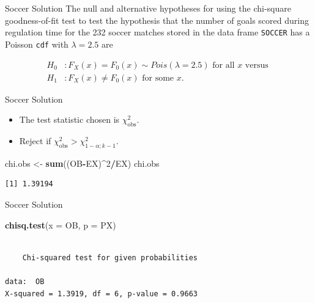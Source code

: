 \documentclass[
  ignorenonframetext,
]{beamer}
\newenvironment{Shaded}{\begin{snugshade}}{\end{snugshade}}
\newcommand{\AttributeTok}[1]{\textcolor[rgb]{0.13,0.29,0.53}{#1}}
\newcommand{\DecValTok}[1]{\textcolor[rgb]{0.00,0.00,0.81}{#1}}
\newcommand{\FunctionTok}[1]{\textcolor[rgb]{0.13,0.29,0.53}{\textbf{#1}}}
\newcommand{\NormalTok}[1]{#1}
\newcommand{\OtherTok}[1]{\textcolor[rgb]{0.56,0.35,0.01}{#1}}
\newcommand{\SpecialCharTok}[1]{\textcolor[rgb]{0.81,0.36,0.00}{\textbf{#1}}}
\begin{document}
\begin{frame}[fragile]{Soccer Solution}
\label{soccer-solution-4}
The null and alternative hypotheses for using the chi-square
goodness-of-fit test to test the hypothesis that the number of goals
scored during regulation time for the 232 soccer matches stored in the
data frame \texttt{SOCCER} has a Poisson \texttt{cdf} with
\(\lambda=2.5\) are

\begin{align*}
        H_0&: F_X(x) = F_0(x) \sim Pois(\lambda=2.5)\text{ for all } x \text{ versus
        }\\
        H_1&:  F_X(x) \ne F_0(x) \text{ for some } x.
\end{align*}
\end{frame}

\begin{frame}[fragile]{Soccer Solution}
\label{soccer-solution-5}
\begin{itemize}
\item
  The test statistic chosen is \(\chi_{\text{obs}}^2.\)
\item
  Reject if \(\chi^2_{\text{obs}}>\chi^2_{1-\alpha;k-1}\).
\end{itemize}

\begin{Shaded}
\begin{Highlighting}[]
\NormalTok{chi.obs }\OtherTok{\textless{}{-}} \FunctionTok{sum}\NormalTok{((OB}\SpecialCharTok{{-}}\NormalTok{EX)}\SpecialCharTok{\^{}}\DecValTok{2}\SpecialCharTok{/}\NormalTok{EX)}
\NormalTok{chi.obs}
\end{Highlighting}
\end{Shaded}

\begin{verbatim}
[1] 1.39194
\end{verbatim}
\end{frame}

\begin{frame}[fragile]{Soccer Solution}
\label{soccer-solution-6}
\begin{Shaded}
\begin{Highlighting}[]
\FunctionTok{chisq.test}\NormalTok{(}\AttributeTok{x =}\NormalTok{ OB, }\AttributeTok{p =}\NormalTok{ PX)}
\end{Highlighting}
\end{Shaded}

\begin{verbatim}

    Chi-squared test for given probabilities

data:  OB
X-squared = 1.3919, df = 6, p-value = 0.9663
\end{verbatim}
\end{frame}
\end{document}

